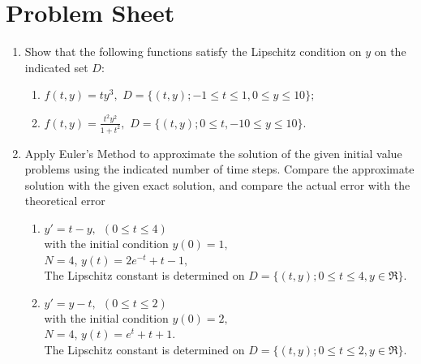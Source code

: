 \section{Problem Sheet}
\begin{enumerate}
\item
Show that the following functions satisfy the Lipschitz condition on $y$ on the indicated set $D$:
\begin{enumerate}
\item
$f(t,y)=ty^3,$  $D=\{(t,y);-1\leq t \leq 1, 0\leq y \leq 10\};$
\item 
$f(t,y)=\frac{t^2y^2}{1+t^2},$  $D=\{(t,y);0\leq t, -10\leq y \leq 10 \}.$

\end{enumerate}
\item
Apply Euler's Method to approximate the solution of the given initial value problems using the indicated number of time steps. Compare the approximate solution with the given exact solution, and compare the actual error with the theoretical error
\begin{enumerate}
\item
$y'=t-y, \ \ (0\leq t \leq 4)$\\
with the initial condition $y(0)=1,$\\
$N=4$, 
$y(t)=2e^{-t}+t-1,$\\

The Lipschitz constant is determined on  $D=\{(t,y);0\leq t \leq 4, y\in \Re \}.$
\item 
$y'=y-t, \ \ (0\leq t \leq 2)$\\
with the initial condition $y(0)=2,$\\
$N=4$, 
$y(t)=e^{t}+t+1$.\\

The Lipschitz constant is determined on  $D=\{(t,y);0\leq t \leq 2, y\in \Re \}.$
\end{enumerate}

\end{enumerate}
\newpage
